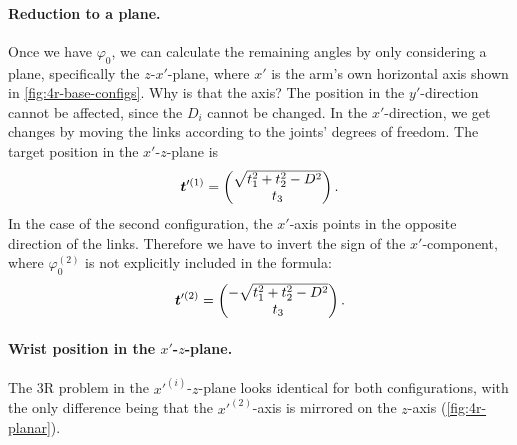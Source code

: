 \paragraph{Reduction to a plane.}
Once we have $\varphi_0$, we can calculate the remaining angles by only
considering a plane, specifically the $z$-$x'$-plane, where $x'$ is the
arm's own horizontal axis shown in \cref{fig:4r-base-configs}. Why is
that the axis? The position in the $y'$-direction cannot be affected,
since the $D_i$ cannot be changed. In the $x'$-direction, we get changes
by moving the links according to the joints' degrees of freedom.
The target position in the $x'$-$z$-plane is
\[
  \bm{t}'^{(1)} =
  \begin{pmatrix} \sqrt{t_1^2 + t_2^2 - D^2} \\ t_3 \end{pmatrix} .
\]
In the case of the second configuration, the $x'$-axis points in the
opposite direction of the links. Therefore we have to invert the sign of
the $x'$-component, where $\varphi_0^{(2)}$ is not explicitly included in
the formula:
\[
  \bm{t}'^{(2)} =
  \begin{pmatrix} -\sqrt{t_1^2 + t_2^2 - D^2} \\ t_3 \end{pmatrix} .
\]

\paragraph{Wrist position in the $x'$-$z$-plane.}
The 3R problem in the $x'^{(i)}$-$z$-plane looks identical for both
configurations, with the only difference being that the $x'^{(2)}$-axis is
mirrored on the $z$-axis (\cref{fig:4r-planar}).

